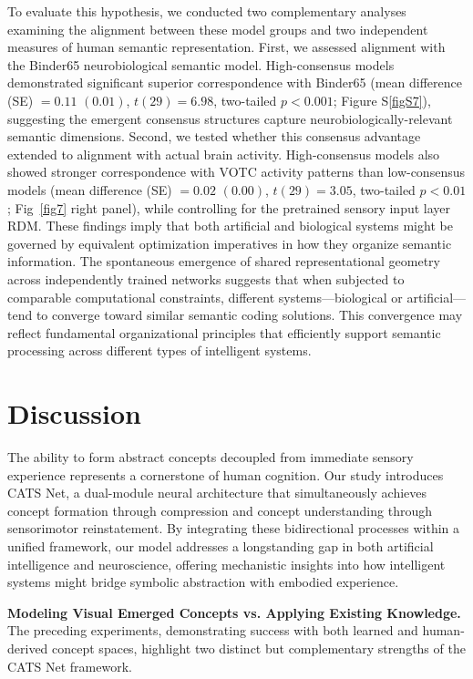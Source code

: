\documentclass[pdflatex,sn-mathphys-num,lineno]{sn-jnl}%
\begin{document}
\begin{CJK}{UTF8}{gbsn}
To evaluate this hypothesis, we conducted two complementary analyses examining the alignment between these model groups and two independent measures of human semantic representation. First, we assessed alignment with the Binder65 neurobiological semantic model. High-consensus models demonstrated significant superior correspondence with Binder65 (mean difference (SE) $= 0.11$ $(0.01)$, $t(29) = 6.98$, two-tailed $p < 0.001$; Figure S\ref{figS7}), suggesting the emergent consensus structures capture neurobiologically-relevant semantic dimensions. Second, we tested whether this consensus advantage extended to alignment with actual brain activity. High-consensus models also showed stronger correspondence with VOTC activity patterns than low-consensus models (mean difference (SE) $= 0.02$ $(0.00)$, $t(29) = 3.05$, two-tailed $p < 0.01$; Fig~\ref{fig7} right panel), while controlling for the pretrained sensory input layer RDM. These findings imply that both artificial and biological systems might be governed by equivalent optimization imperatives in how they organize semantic information. The spontaneous emergence of shared representational geometry across independently trained networks suggests that when subjected to comparable computational constraints, different systems—biological or artificial— tend to converge toward similar semantic coding solutions. This convergence may reflect fundamental organizational principles that efficiently support semantic processing across different types of intelligent systems.

\section{Discussion}

The ability to form abstract concepts decoupled from immediate sensory experience represents a cornerstone of human cognition. Our study introduces CATS Net, a dual-module neural architecture that simultaneously achieves concept formation through compression and concept understanding through sensorimotor reinstatement. By integrating these bidirectional processes within a unified framework, our model addresses a longstanding gap in both artificial intelligence and neuroscience, offering mechanistic insights into how intelligent systems might bridge symbolic abstraction with embodied experience.

\textbf{Modeling Visual Emerged Concepts vs. Applying Existing Knowledge.} The preceding experiments, demonstrating success with both learned and human-derived concept spaces, highlight two distinct but complementary strengths of the CATS Net framework. 


\end{CJK}
\end{document}
